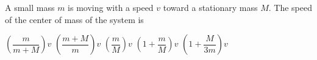 \documentclass{../../oss-apphys-exam}
\begin{document}
\begin{multicols*}{2}
\begin{questions}

    \question A small mass $m$ is moving with a speed $v$ toward a
    stationary mass $M$. The speed of the center of mass of the system is
    \begin{choices}
      \choice $\left(\dfrac m{m+M}\right)v$
      \choice $\left(\dfrac{m+M} m\right)v$
      \choice $\left(\dfrac mM\right)v$
      \choice $\left(1+\dfrac mM\right)v$
      \choice $\left(1+\dfrac M{3m}\right)v$
    \end{choices}



\end{questions}
\end{multicols*}
\end{document}
